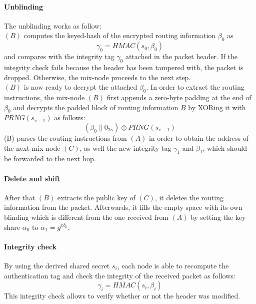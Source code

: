\paragraph{Unblinding} 
The unblinding works as follow:
\\$(B)$ computes the keyed-hash of the encrypted routing information $\beta_0$ as $$\gamma_0=HMAC(s_0,\beta_0)$$ and compares with the integrity tag $\gamma_0$ attached in the packet header. If the integrity check fails because the header has been tampered with, the packet is dropped. Otherwise, the mix-node proceeds to the next step.
\\$(B)$ is now ready to decrypt the attached $\beta_0$. In order to extract the routing instructions, the mix-node $(B)$ first appends a zero-byte padding at the end of $\beta_0$ and decrypts the padded block of routing information $B$ by XORing it with $PRNG(s_{v-1})$ as follows:
$$(\beta_0\|0_{2\kappa})\oplus PRNG(s_{v-1})$$
(B) parses the routing instructions from $(A)$ in order to obtain the address of the next mix-node $(C)$, as well the new integrity tag $\gamma_1$ and $\beta_1$, which should be forwarded to the next hop.
\paragraph{Delete and shift}
After that $(B)$ extracts the public key of $(C)$, it deletes the routing information from the packet. Afterwards, it fills the empty space with its own blinding which is different from the one received from $(A)$ by setting the key share $\alpha_0$ to $\alpha_1=g^{xb_0}$.

\paragraph{Integrity check}
By using the derived shared secret $s_i$, each node is able to recompute the authentication tag and check the integrity of the received packet as follows: $$\gamma_i=HMAC(s_i,\beta_i)$$
This integrity check allows to verify whether or not the header was modified.
